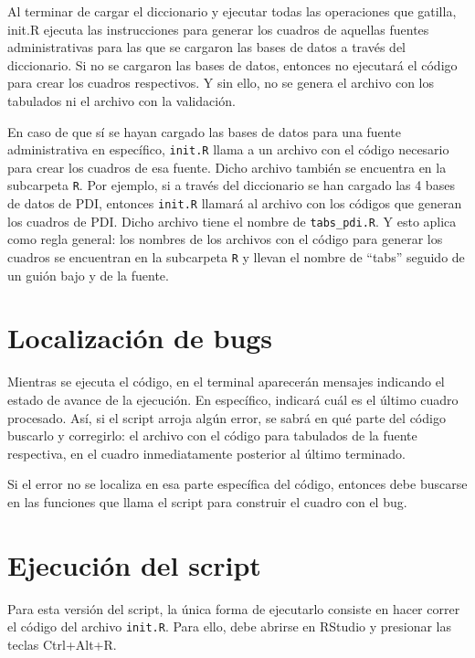 \documentclass[
  spanish,
]{book}
\begin{document}
Al terminar de cargar el diccionario y ejecutar todas las operaciones que gatilla, init.R ejecuta las instrucciones para generar los cuadros de aquellas fuentes administrativas para las que se cargaron las bases de datos a través del diccionario. Si no se cargaron las bases de datos, entonces no ejecutará el código para crear los cuadros respectivos. Y sin ello, no se genera el archivo con los tabulados ni el archivo con la validación.

En caso de que sí se hayan cargado las bases de datos para una fuente administrativa en específico, \texttt{init.R} llama a un archivo con el código necesario para crear los cuadros de esa fuente. Dicho archivo también se encuentra en la subcarpeta \texttt{R}. Por ejemplo, si a través del diccionario se han cargado las 4 bases de datos de PDI, entonces \texttt{init.R} llamará al archivo con los códigos que generan los cuadros de PDI. Dicho archivo tiene el nombre de \texttt{tabs\_pdi.R}. Y esto aplica como regla general: los nombres de los archivos con el código para generar los cuadros se encuentran en la subcarpeta \texttt{R} y llevan el nombre de ``tabs'' seguido de un guión bajo y de la fuente.

\hypertarget{localizaciuxf3n-de-bugs}{%
\section{Localización de bugs}\label{localizaciuxf3n-de-bugs}}

Mientras se ejecuta el código, en el terminal aparecerán mensajes indicando el estado de avance de la ejecución. En específico, indicará cuál es el último cuadro procesado. Así, si el script arroja algún error, se sabrá en qué parte del código buscarlo y corregirlo: el archivo con el código para tabulados de la fuente respectiva, en el cuadro inmediatamente posterior al último terminado.

Si el error no se localiza en esa parte específica del código, entonces debe buscarse en las funciones que llama el script para construir el cuadro con el bug.

\hypertarget{ejecuciuxf3n-del-script}{%
\section{Ejecución del script}\label{ejecuciuxf3n-del-script}}

Para esta versión del script, la única forma de ejecutarlo consiste en hacer correr el código del archivo \texttt{init.R}. Para ello, debe abrirse en RStudio y presionar las teclas Ctrl+Alt+R.
\end{document}
